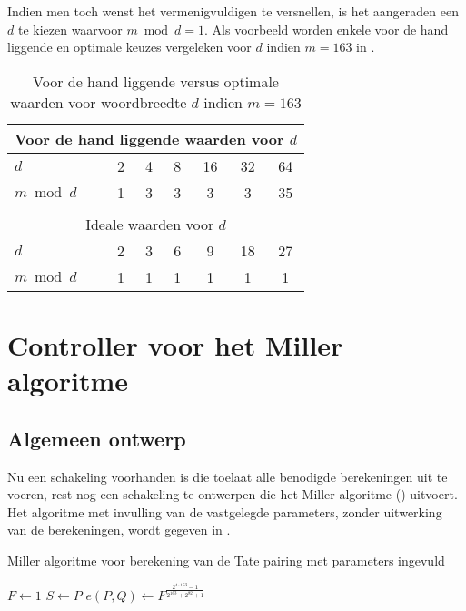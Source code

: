 Indien men toch wenst het vermenigvuldigen te versnellen, is het aangeraden een $d$ te kiezen waarvoor $m \bmod d = 1$. Als voorbeeld worden enkele voor de hand liggende en optimale keuzes vergeleken voor $d$ indien $m = 163$ in .

\begin{table}[h]
	\caption{Voor de hand liggende versus optimale waarden voor woordbreedte $d$ indien \mbox{$m=163$}}
	\label{tabel-implementatie-woordbreedte-d}
	\begin{tabular}{|l|c|c|c|c|c|c|}
		\hline
		\multicolumn{7}{|c|}{Voor de hand liggende waarden voor $d$}\\
		\hline
		$d$			& 2	& 4	& 8	& 16	& 32	& 64\\
		$m \bmod d$	& 1	& 3	& 3	& 3	& 3	& 35\\
		\hline
		\multicolumn{7}{c}{}\\
		\hline
		\multicolumn{7}{|c|}{Ideale waarden voor $d$}\\
		\hline
		$d$			& 2	& 3	& 6	& 9	& 18	& 27\\
		$m \bmod d$	& 1	& 1	& 1	& 1	& 1	& 1\\
		\hline
	\end{tabular}
\end{table}

\section{Controller voor het Miller algoritme}\label{sectie-implementatie-miller}

\subsection{Algemeen ontwerp}\label{subsectie-implementatie-miller-ontwerp}

Nu een schakeling voorhanden is die toelaat alle benodigde berekeningen uit te voeren, rest nog een schakeling te ontwerpen die het Miller algoritme () uitvoert. Het algoritme met invulling van de vastgelegde parameters, zonder uitwerking van de berekeningen, wordt gegeven in .

\begin{algorithm}[h]
	\caption{Miller algoritme voor berekening van de Tate pairing met parameters ingevuld}
	\label{algoritme-implementatie-miller-algemeen}
	$F \leftarrow 1$\;
	$S \leftarrow P$\;
	$e(P, Q) \leftarrow F^{\frac{2^{4 \cdot 163} - 1}{2^{163} + 2^{82} + 1}}$\;
\end{algorithm}

